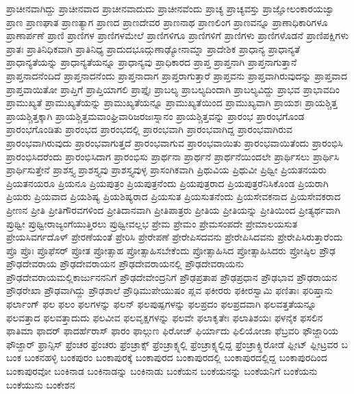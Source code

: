 {ಪ್ರಾಚೀನವಾಗಿದ್ದು
ಪ್ರಾಚೀನವಾದ
ಪ್ರಾಚೀನವಾದುದು
ಪ್ರಾಚೀನವೆಂದು
ಪ್ರಾಚ್ಯ
ಪ್ರಾಚ್ಯವಸ್ತು
ಪ್ರಾಜ್ಞೋಲಂಕಾರಯಜ್ವಾ
ಪ್ರಾಣ
ಪ್ರಾಣಘಾತ
ಪ್ರಾಣತ್ಯಾಗ
ಪ್ರಾಣದ
ಪ್ರಾಣದೇವರ
ಪ್ರಾಣನಾಥ
ಪ್ರಾಣಲಿಂಗ
ಪ್ರಾಣವನ್ನೂ
ಪ್ರಾಣಾಧಿಕಾರಿಗಳೂ
ಪ್ರಾಣಾರ್ಪಣೆ
ಪ್ರಾಣಿ
ಪ್ರಾಣಿಗಳ
ಪ್ರಾಣಿಗಳಮೇಲೆ
ಪ್ರಾಣಿಗಳಿಗೂ
ಪ್ರಾಣಿಗಳಿಗೆ
ಪ್ರಾಣಿಗಳು
ಪ್ರಾಣಿಗಳೊಡನೆ
ಪ್ರಾಣಿಪಕ್ಷಿಗಳು
ಪ್ರಾತಃ
ಪ್ರಾತಿನಿಧಿಕವಾಗಿ
ಪ್ರಾತಿನಿಧ್ಯ
ಪ್ರಾದುದಭೂದ್ಗುಣಾಢ್ಯೋನಾಮ್ನಾ
ಪ್ರಾದೇಶಿಕ
ಪ್ರಾಧಾನ್ಯ
ಪ್ರಾಧಾನ್ಯತೆ
ಪ್ರಾಧಾನ್ಯತೆಯನ್ನು
ಪ್ರಾಧಾನ್ಯತೆಯನ್ನೂ
ಪ್ರಾಧಾನ್ಯವು
ಪ್ರಾಧಿಕಾರದ
ಪ್ರಾಪ್ತ
ಪ್ರಾಪ್ತನಾಗಿ
ಪ್ರಾಪ್ತನಾಗುತ್ತಾನೆ
ಪ್ರಾಪ್ತನಾದನೆಂದಿದೆ
ಪ್ರಾಪ್ತನಾದನೆಂದು
ಪ್ರಾಪ್ತನಾದಾಗ
ಪ್ರಾಪ್ತರಾಗುತ್ತಾರೆ
ಪ್ರಾಪ್ತವನು
ಪ್ರಾಪ್ತವಾಗಿರುವುದನ್ನು
ಪ್ರಾಪ್ತವಾದ
ಪ್ರಾಪ್ತವಾಯಿತೋ
ಪ್ರಾಪ್ತಿಗೆ
ಪ್ರಾಪ್ತಿಯಾಗಲಿ
ಪ್ರಾಪ್ತೈಃ
ಪ್ರಾಬಲ್ಯ
ಪ್ರಾಬಲ್ಯದಿಂದಾಗಿ
ಪ್ರಾಬಲ್ಯವಿದ್ದು
ಪ್ರಾಭವ
ಪ್ರಾಭಾವದಿಂ
ಪ್ರಾಮುಖ್ಯತೆ
ಪ್ರಾಮುಖ್ಯತೆಯನ್ನು
ಪ್ರಾಮುಖ್ಯತೆಯನ್ನೂ
ಪ್ರಾಮುಖ್ಯತೆಯಿಂದ
ಪ್ರಾಮುಖ್ಯವಾಗಿ
ಪ್ರಾಯಶಃ
ಪ್ರಾಯಶ್ಚಿತ್ತ
ಪ್ರಾಯಶ್ಚಿತ್ತಕ್ಕಾಗಿ
ಪ್ರಾಯಶ್ಚಿತ್ತಮವಾಂಘ್ರಿವಾರಿಜರಜಃಸ್ನಾನಂ
ಪ್ರಾಯಶ್ಚಿತ್ತವನ್ನು
ಪ್ರಾರಂಭ
ಪ್ರಾರಂಭಗೊಂಡ
ಪ್ರಾರಂಭಗೊಂಡಿತು
ಪ್ರಾರಂಭದ
ಪ್ರಾರಂಭದಲ್ಲಿ
ಪ್ರಾರಂಭವಾಗಿ
ಪ್ರಾರಂಭವಾಗಿದ್ದ
ಪ್ರಾರಂಭವಾಗಿರುವ
ಪ್ರಾರಂಭವಾಗಿರುವುದು
ಪ್ರಾರಂಭವಾಗುತ್ತದೆ
ಪ್ರಾರಂಭವಾಗುವ
ಪ್ರಾರಂಭವಾಯಿತು
ಪ್ರಾರಂಭವಾಯಿತೆಂದು
ಪ್ರಾರಂಭಿಸಿ
ಪ್ರಾರಂಭಿಸಿದರೆಂದು
ಪ್ರಾರಂಭಿಸಿದಾಗ
ಪ್ರಾರಂಭಿಸು
ಪ್ರಾರ್ಥನಾ
ಪ್ರಾರ್ಥನೆ
ಪ್ರಾರ್ಥನೆಯಿಂದಲೇ
ಪ್ರಾರ್ಥಿಸಲು
ಪ್ರಾರ್ಥಿಸಿ
ಪ್ರಾರ್ಥಿಸುತ್ತೇನೆ
ಪ್ರಾಶಸ್ತ್ಯ
ಪ್ರಾಶಸ್ತ್ಯವು
ಪ್ರಾಶಸ್ತ್ಯವುಳ್ಳ
ಪ್ರಾಸಂಗಿಕವಾಗಿ
ಪ್ರಿಥುವಿಯ
ಪ್ರಿಥುವೀ
ಪ್ರಿಥ್ವೀ
ಪ್ರಿಯತನಯರು
ಪ್ರಿಯತನಯರೂ
ಪ್ರಿಯನೂ
ಪ್ರಿಯಪುತ್ರಂ
ಪ್ರಿಯಪುತ್ರನೆಂದು
ಪ್ರಿಯಪುತ್ರರಾದ
ಪ್ರಿಯಪುತ್ರರೆನಿಸಿಕೊಂಡ
ಪ್ರಿಯರಾಗಿ
ಪ್ರಿಯರು
ಪ್ರಿಯವಾದ
ಪ್ರಿಯಶಿಷ್ಯ
ಪ್ರಿಯಶಿಷ್ಯರಾದ
ಪ್ರಿಯಸುತ
ಪ್ರಿಯಸುತನೆಂದು
ಪ್ರಿಯಸೇವಕನಾದ
ಪ್ರಿಯಸೇವಕರಾದ
ಪ್ರೀಣನ
ಪ್ರೀತಿ
ಪ್ರೀತಿಗೌರವಗಳಿಂದ
ಪ್ರೀತಿದಾನವಾಗಿ
ಪ್ರೀತಿಪಾತ್ರರು
ಪ್ರೀತಿಯ
ಪ್ರೀತಿಯನ್ನು
ಪ್ರೀತಿಯಿಂದ
ಪ್ರೀತ್ಯರ್ಥವಾಗಿ
ಪ್ರುಥ್ವೀ
ಪ್ರುಥ್ವೀರಾಜ್ಯಂಗೆಯುತ್ತಿರಲು
ಪ್ರುಥ್ವೀವಲ್ಲಭ
ಪ್ರೇಮ
ಪ್ರೇಮಂ
ಪ್ರೇಮಸಂಪದೇ
ಪ್ರೇಮಾಲಯಸುತ
ಪ್ರೇಯಸಿವರ್ಗದೊಳ್
ಪ್ರೇರಣೆಯಂತೆ
ಪ್ರೇರಿಸಿ
ಪ್ರೇರೇಪಣೆ
ಪ್ರೇರೇಪಿಸದವನು
ಪ್ರೇರೇಪಿಸಿದವನು
ಪ್ರೇರೇಪಿಸಿರುತ್ತಾರೆಂದು
ಪ್ರೊ
ಪ್ರೊಃ
ಪ್ರೊಫೆಸರ್
ಪ್ರೋತ
ಪ್ರೋತ್ಸಾಹ
ಪ್ರೋತ್ಸಾಹಿಸಬೇಕೆಂದು
ಪ್ರೋತ್ಸಾಹಿಸಿದ
ಪ್ರೋತ್ಸಾಹಿಸಿದರು
ಪ್ರೋಷ್ಠಿಲ
ಪ್ರೌಢ
ಪ್ರೌಢದೇವರಾಯ
ಪ್ರೌಢದೇವರಾಯನ
ಪ್ರೌಢದೇವರಾಯನಲ್ಲಿ
ಪ್ರೌಢದೇವರಾಯನು
ಪ್ರೌಢದೇವರಾಯಮಲ್ಲಿಕಾರ್ಜುನನನಿಗೆ
ಪ್ರೌಢದೇವೇಂದ್ರನಿಗೆ
ಪ್ರೌಢಪ್ರತಾಪ
ಪ್ರೌಢಪ್ರಧಾನ
ಪ್ರೌಢಭಾವ
ಪ್ರೌಢರಾಯನ
ಪ್ರೌಢರೇಖಾ
ಪ್ರೌಢವಾಗಿದ್ದು
ಪ್ರೌಢಶಾಲೆ
ಪ್ರೌಢಿಮುಪೇಯುಷಂ
ಪ್ಲವ
ಫಕೀರರು
ಫಕೀರಸ್ವಾಮಿ
ಫಣಿತಾಃ
ಫರಿಷ್ತಾನು
ಫರ್ಲಾಂಗ್
ಫಲ
ಫಲಂ
ಫಲಗಳನ್ನು
ಫಲನ್
ಫಲಪುಷ್ಪಗಳನ್ನು
ಫಲಪ್ರದಂ
ಫಲಪ್ರದವಾಗಿ
ಫಲವತ್ತತೆಯನ್ನೂ
ಫಲವತ್ತಾದ
ಫಲವತ್ತಾದುದು
ಫಲವೀವ
ಫಲವೃಕ್ಷಗಳನ್ನು
ಫಲವೇ
ಫಲಾಕೃತೇಃ
ಫಲಾತಿಶಯಃ
ಫಳನೈಕ
ಫಸಲಿನ
ಫಾತಿಮಾ
ಫಾದರ್
ಫಾದರ್ಹೆರಾಸ್
ಫಾರಂ
ಫಾಲ್ಗುಣ
ಫಿರೋಜ್
ಫಿರ್ಯಾದು
ಫಿಲಿಯೋಜಾ
ಫೆಬ್ರವರಿ
ಫೌಜ್ದಾರಿಯ
ಫೌಜ್ದಾರ್
ಫ್ರಾನ್ಸಿಸ್
ಫ್ರೆಂಚರ
ಫ್ರೆಂಚರು
ಫ್ರೆಂಚ್ರಾಕ್ಸ್
ಫ್ರೆಂಚ್ರಾಕ್ಸ್ನಲ್ಲಿ
ಫ್ರೆಂಚ್ರಾಕ್ಸ್ನಲ್ಲಿದ್ದ
ಫ್ರೆಂಚ್ರಾಕ್ಸ್ಹಿರೋಡೆ
ಫ್ಲೀಟ್
ಫ್ಲೀಟ್ರವರ
ಬ
ಬಂಕ
ಬಂಕನಹಳ್ಳಿ
ಬಂಕಪುರಂ
ಬಂಕಾಪುರಕ್ಕೆ
ಬಂಕಾಪುರದ
ಬಂಕಾಪುರದಲ್ಲಿ
ಬಂಕಾಪುರದಲ್ಲಿದ್ದ
ಬಂಕಾಪುರದಿಂದ
ಬಂಕಾಪುರವೋ
ಬಂಕಿನಾಡ
ಬಂಕಿನಾಡನ್ನು
ಬಂಕಿನಾಡು
ಬಂಕೆಯನ
ಬಂಕೆಯನನ್ನು
ಬಂಕೆಯನಿಗೆ
ಬಂಕೆಯನು
ಬಂಕೆಯುನು
ಬಂಕೇಶನ
}

